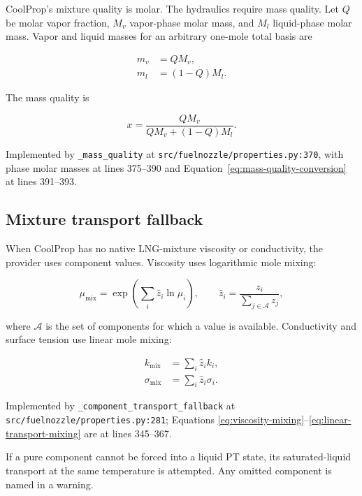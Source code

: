 \documentclass[11pt]{article}
\newcommand{\code}[1]{\nolinkurl{#1}}
\newcommand{\srcline}[2]{\nolinkurl{#1:#2}}
\begin{document}
CoolProp's mixture quality is molar. The hydraulics require mass quality. Let $Q$ be
molar vapor fraction, $M_v$ vapor-phase molar mass, and $M_l$ liquid-phase molar
mass. Vapor and liquid masses for an arbitrary one-mole total basis are

\begin{align}
  m_v &= Q M_v, \\
  m_l &= (1-Q)M_l.
\end{align}

The mass quality is

\begin{equation}
  x = \frac{Q M_v}{Q M_v + (1-Q)M_l}.
  \label{eq:mass-quality-conversion}
\end{equation}

Implemented by \code{_mass_quality} at
\srcline{src/fuelnozzle/properties.py}{370}, with phase molar masses at lines
375--390 and Equation~\eqref{eq:mass-quality-conversion} at lines 391--393.

\subsection{Mixture transport fallback}

When CoolProp has no native LNG-mixture viscosity or conductivity, the provider uses
component values. Viscosity uses logarithmic mole mixing:

\begin{equation}
  \mu_{\mathrm{mix}} = \exp\left(\sum_i \hat z_i\ln\mu_i\right),
  \qquad \hat z_i=\frac{z_i}{\sum_{j\in\mathcal A}z_j},
  \label{eq:viscosity-mixing}
\end{equation}

where $\mathcal A$ is the set of components for which a value is available.
Conductivity and surface tension use linear mole mixing:

\begin{align}
  k_{\mathrm{mix}} &= \sum_i \hat z_i k_i, \\
  \sigma_{\mathrm{mix}} &= \sum_i \hat z_i \sigma_i.
  \label{eq:linear-transport-mixing}
\end{align}

Implemented by \code{_component_transport_fallback} at
\srcline{src/fuelnozzle/properties.py}{281}; Equations
\eqref{eq:viscosity-mixing}--\eqref{eq:linear-transport-mixing} are at lines
345--367.

If a pure component cannot be forced into a liquid PT state, its saturated-liquid
transport at the same temperature is attempted. Any omitted component is named in a
warning.
\end{document}
